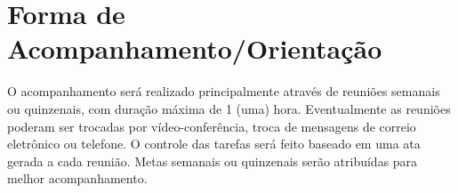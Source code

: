 \section{Forma de Acompanhamento/Orientação}

O acompanhamento será realizado principalmente através de reuniões semanais ou quinzenais, com duração máxima de 1 (uma) hora.
%
Eventualmente as reuniões poderam ser trocadas por vídeo-conferência, troca de mensagens de correio eletrônico ou telefone.
%
O controle das tarefas será feito baseado em uma ata gerada a cada reunião.
%
Metas semanais ou quinzenais serão atribuídas para melhor acompanhamento.
